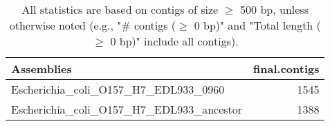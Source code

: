 \documentclass[12pt,a4paper]{article}
\begin{document}
\begin{table}[ht]
\begin{center}
\caption{All statistics are based on contigs of size $\geq$ 500 bp, unless otherwise noted (e.g., "\# contigs ($\geq$ 0 bp)" and "Total length ($\geq$ 0 bp)" include all contigs).}
\begin{tabular}{|l*{1}{|r}|}
\hline
Assemblies & final.contigs \\ \hline
Escherichia\_coli\_O157\_H7\_EDL933\_0960 & 1545 \\ \hline
Escherichia\_coli\_O157\_H7\_EDL933\_ancestor & 1388 \\ \hline
\end{tabular}
\end{center}
\end{table}
\end{document}
